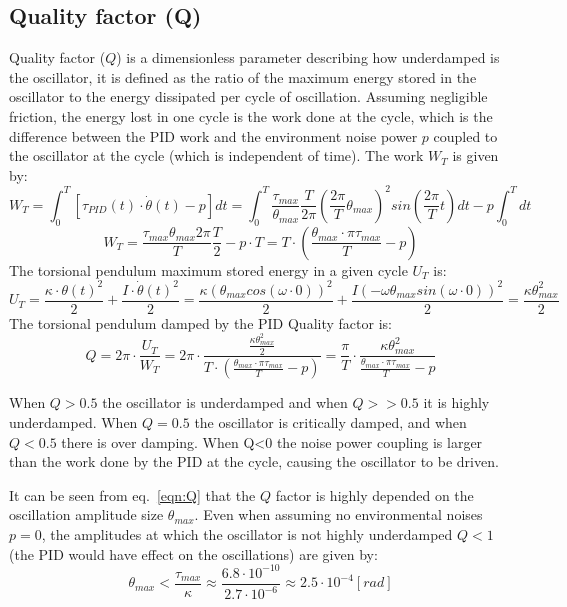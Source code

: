 \documentclass[\main/master.tex]{subfiles}
\begin{document}
\subsection{Quality factor (Q)}
Quality factor ($Q$) is a dimensionless parameter describing how underdamped is the oscillator, it is defined as the ratio of the maximum energy stored in the oscillator to the energy dissipated per cycle of oscillation.
Assuming negligible friction, the energy lost in one cycle is the work done at the cycle, which is the difference between the PID work and the environment noise power $p$ coupled to the oscillator at the cycle (which is independent of time). The work $W_T$ is given by:
\begin{equation}
W_T = \int_0^T[\tau_{PID}(t)\cdot\dot{\theta}(t) - p]dt = \int_0^T\frac{\tau_{max} }{\theta_{max}} \frac{ T}{2\pi}(\frac{2\pi}{T}\theta_{max})^2 sin(\frac{2\pi}{T}t)dt-p\int_0^T dt 
\label{eqn:pid work 1}
\end{equation}
\begin{equation}
W_T = \frac{\tau_{max}\theta_{max}2\pi}{T} \frac{T}{2}-p\cdot T = T\cdot(\frac{\theta_{max}\cdot\pi\tau_{max}}{T} -p)
\label{eqn:pid work}
\end{equation}
The torsional pendulum maximum stored energy in a given cycle $U_T$ is:
\begin{equation}
U_T = \frac{\kappa\cdot\theta(t)^2}{2}+\frac{I\cdot\dot{\theta}(t)^2}{2} =\frac{\kappa(\theta_{max}cos(\omega\cdot 0))^2}{2}+\frac{I(-\omega\theta_{max}sin(\omega\cdot 0))^2}{2} = \frac{\kappa\theta_{max}^2}{2}
\label{eqn:pendulum energy}
\end{equation}
The torsional pendulum damped by the PID Quality factor is:
\begin{equation}
Q = 2\pi\cdot \frac{U_T}{W_T}= 2\pi\cdot\frac{\frac{\kappa\theta_{max}^2}{2}}{T\cdot(\frac{\theta_{max}\cdot\pi\tau_{max}}{T} -p)} =
\frac{\pi}{T}\cdot\frac{\kappa\theta_{max}^2}{\frac{\theta_{max}\cdot\pi\tau_{max}}{T} -p}
\label{eqn:Q}
\end{equation} 

When $Q>0.5$ the oscillator is underdamped and when $Q>>0.5$ it is highly underdamped. When $Q = 0.5$ the oscillator is critically damped, and when $Q < 0.5$ there is over damping. When Q<0 the noise power coupling is larger than the work done by the PID at the cycle, causing the oscillator to be driven. 
\par\noindent
It can be seen from eq.~\ref{eqn:Q} that the $Q$ factor is highly depended on the oscillation amplitude size $\theta_{max}$. Even when assuming no environmental noises $p=0$, the amplitudes at which the oscillator is not highly underdamped $Q < 1$ (the PID would have effect on the oscillations) are given by:  
\begin{equation}
\theta_{max} < \frac{\tau_{max}}{\kappa} \approx \frac{6.8\cdot 10^{-10}}{2.7\cdot 10^{-6}} \approx 2.5\cdot 10^{-4} [rad]
\label{eqn:low Q}
\end{equation}
\end{document}
